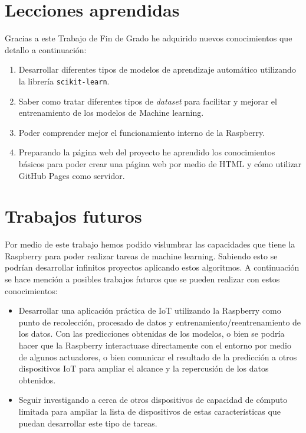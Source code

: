 \documentclass[a4paper, 12pt]{book}
\begin{document}
\section{Lecciones aprendidas}
\label{sec:lecciones_aprendidas}

Gracias a este Trabajo de Fin de Grado he adquirido nuevos conocimientos que detallo a continuación:

\begin{enumerate}
  \item Desarrollar diferentes tipos de modelos de aprendizaje automático utilizando la librería \texttt{scikit-learn}.
  \item Saber como tratar diferentes tipos de \textit{dataset} para facilitar y mejorar el entrenamiento de los modelos de Machine learning.
  \item Poder comprender mejor el funcionamiento interno de la Raspberry.
  \item Preparando la página web del proyecto he aprendido los conocimientos básicos para poder crear una página web por medio de HTML y cómo utilizar GitHub Pages como servidor.
\end{enumerate} 


\section{Trabajos futuros}
\label{sec:trabajos_futuros}

Por medio de este trabajo hemos podido vislumbrar las capacidades que tiene la Raspberry para poder realizar tareas de machine learning. Sabiendo esto se podrían desarrollar infinitos proyectos aplicando estos algoritmos. A continuación se hace mención a posibles trabajos futuros que se pueden realizar con estos conocimientos:

\begin{itemize}
    \item Desarrollar una aplicación práctica de IoT utilizando la Raspberry como punto de recolección, procesado de datos y entrenamiento/reentrenamiento de los datos. Con las predicciones obtenidas de los modelos, o bien se podría hacer que la Raspberry interactuase directamente con el entorno por medio de algunos actuadores, o bien comunicar el resultado de la predicción a otros dispositivos IoT para ampliar el alcance y la repercusión de los datos obtenidos.
    
    \item Seguir investigando a cerca de otros dispositivos de capacidad de cómputo limitada para ampliar la lista de dispositivos de estas características que puedan desarrollar este tipo de tareas.
\end{itemize}
\end{document}

